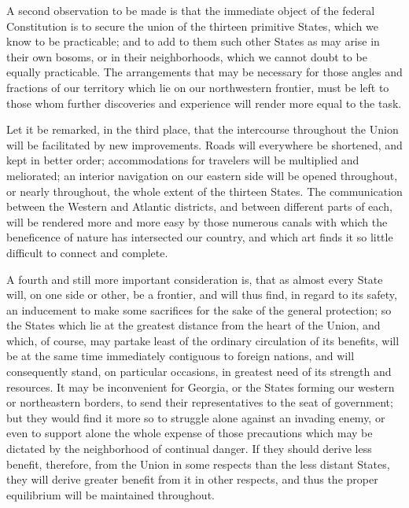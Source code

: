 A second observation to be made is that the immediate object of the federal Constitution is to secure the union of the thirteen primitive States, which we know to be practicable; and to add to them such other States as may arise in their own bosoms, or in their neighborhoods, which we cannot doubt to be equally practicable. The arrangements that may be necessary for those angles and fractions of our territory which lie on our northwestern frontier, must be left to those whom further discoveries and experience will render more equal to the task.

Let it be remarked, in the third place, that the intercourse throughout the Union will be facilitated by new improvements. Roads will everywhere be shortened, and kept in better order; accommodations for travelers will be multiplied and meliorated; an interior navigation on our eastern side will be opened throughout, or nearly throughout, the whole extent of the thirteen States. The communication between the Western and Atlantic districts, and between different parts of each, will be rendered more and more easy by those numerous canals with which the beneficence of nature has intersected our country, and which art finds it so little difficult to connect and complete.

A fourth and still more important consideration is, that as almost every State will, on one side or other, be a frontier, and will thus find, in regard to its safety, an inducement to make some sacrifices for the sake of the general protection; so the States which lie at the greatest distance from the heart of the Union, and which, of course, may partake least of the ordinary circulation of its benefits, will be at the same time immediately contiguous to foreign nations, and will consequently stand, on particular occasions, in greatest need of its strength and resources. It may be inconvenient for Georgia, or the States forming our western or northeastern borders, to send their representatives to the seat of government; but they would find it more so to struggle alone against an invading enemy, or even to support alone the whole expense of those precautions which may be dictated by the neighborhood of continual danger. If they should derive less benefit, therefore, from the Union in some respects than the less distant States, they will derive greater benefit from it in other respects, and thus the proper equilibrium will be maintained throughout.

